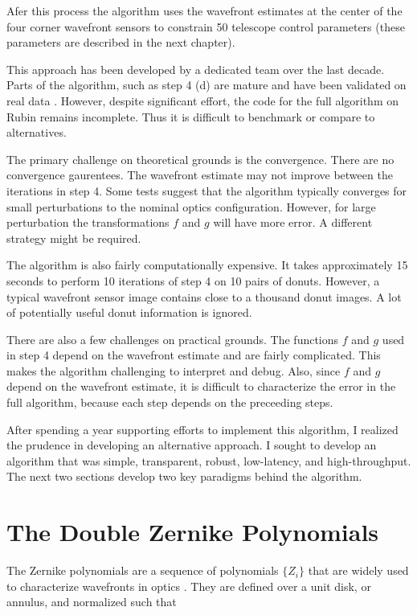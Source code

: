 \noindent Afer this process the algorithm uses the wavefront estimates at the center of the four corner wavefront sensors to constrain 50 telescope control parameters (these parameters are described in the next chapter). 

This approach has been developed by a dedicated team over the last decade. Parts of the algorithm, such as step 4 (d) are mature and have been validated on real data \cite{cwfs_comparison}. However, despite significant effort, the code for the full algorithm on Rubin remains incomplete. Thus it is difficult to benchmark or compare to alternatives.

The primary challenge on theoretical grounds is the convergence. There are no convergence gaurentees. The wavefront estimate may not improve between the iterations in step 4. Some tests suggest that the algorithm typically converges for small perturbations to the nominal optics configuration. However, for large perturbation the transformations $f$ and $g$ will have more error. A different strategy might be required.

The algorithm is also fairly computationally expensive. It takes approximately 15 seconds to perform 10 iterations of step 4 on 10 pairs of donuts. However, a typical wavefront sensor image contains close to a thousand donut images. A lot of potentially useful donut information is ignored.

There are also a few challenges on practical grounds. The functions $f$ and $g$ used in step 4 depend on the wavefront estimate and are fairly complicated. This makes the algorithm challenging to interpret and debug. Also, since $f$ and $g$ depend on the wavefront estimate, it is difficult to characterize the error in the full algorithm, because each step depends on the preceeding steps. 

After spending a year supporting efforts to implement this algorithm, I realized the prudence in developing an alternative approach. I sought to develop an algorithm that was simple, transparent, robust, low-latency, and high-throughput. The next two sections develop two key paradigms behind the algorithm.

\section{The Double Zernike Polynomials}

The Zernike polynomials are a sequence of polynomials $\{Z_i\}$ that are widely used to characterize wavefronts in optics \cite{zernike}. They are defined over a unit disk, or annulus, and normalized such that

